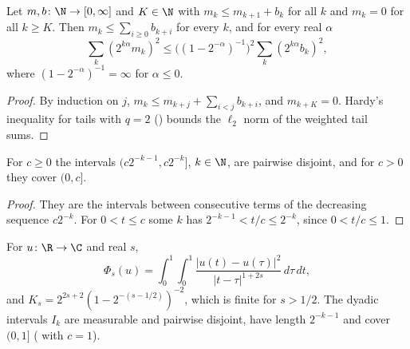 \begin{lemma}
\label{lem:telescoping-hardy}
\leanok
{}
Let $m, b \colon \N \to [0, \infty]$ and $K \in \N$ with $m_k \leq m_{k+1} + b_k$ for all $k$
and $m_k = 0$ for all $k \geq K$. Then $m_k \leq \sum_{i \geq 0} b_{k+i}$ for every $k$, and for
every real $\alpha$
\[
  \sum_k (2^{k\alpha} m_k)^2 \leq \bigl((1 - 2^{-\alpha})^{-1}\bigr)^2 \sum_k (2^{k\alpha} b_k)^2 ,
\]
where $(1 - 2^{-\alpha})^{-1} = \infty$ for $\alpha \leq 0$.
\end{lemma}

\begin{proof}
\leanok
{}
By induction on $j$, $m_k \leq m_{k+j} + \sum_{i < j} b_{k+i}$, and $m_{k+K} = 0$. Hardy's
inequality for tails with $q = 2$ () bounds the $\ell_2$ norm of the weighted
tail sums.
\end{proof}

\begin{lemma}
\label{lem:scaled-dyadic-intervals}
\leanok
For $c \geq 0$ the intervals $(c 2^{-k-1}, c 2^{-k}]$, $k \in \N$, are pairwise disjoint, and
for $c > 0$ they cover $(0, c]$.
\end{lemma}

\begin{proof}
\leanok
They are the intervals between consecutive terms of the decreasing sequence $c 2^{-k}$. For
$0 < t \leq c$ some $k$ has $2^{-k-1} < t/c \leq 2^{-k}$, since $0 < t/c \leq 1$.
\end{proof}

\begin{definition}[{The Gagliardo form on $(0, 1]$}]
\label{def:half-line-form}
\leanok
{}
For $u \colon \R \to \C$ and real $s$,
\[
  \Phi_s(u) = \int_0^1 \int_0^1 \frac{|u(t) - u(\tau)|^2}{|t - \tau|^{1+2s}} \, d\tau \, dt ,
\]
and $K_s = 2^{2s+2} (1 - 2^{-(s-1/2)})^{-2}$, which is finite for $s > 1/2$. The dyadic intervals
$I_k$ are measurable and pairwise disjoint, have length $2^{-k-1}$ and cover $(0, 1]$
( with $c = 1$).
\end{definition}

